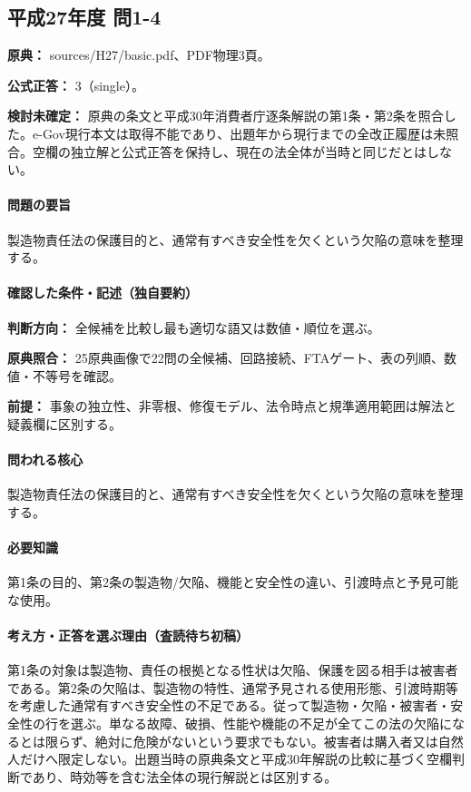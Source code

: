 \subsection{平成27年度 問1-4}
\label{q:h27-reg-basic-1-4}

\noindent\textbf{原典：} sources/H27/basic.pdf、PDF物理3頁。

\textbf{公式正答：} 3（single）。

\par\textbf{検討未確定：} 原典の条文と平成30年消費者庁逐条解説の第1条・第2条を照合した。e-Gov現行本文は取得不能であり、出題年から現行までの全改正履歴は未照合。空欄の独立解と公式正答を保持し、現在の法全体が当時と同じだとはしない。

\paragraph{問題の要旨} 製造物責任法の保護目的と、通常有すべき安全性を欠くという欠陥の意味を整理する。

\paragraph{確認した条件・記述（独自要約）}\mbox{}\par

\noindent\textbf{判断方向：} 全候補を比較し最も適切な語又は数値・順位を選ぶ。\par

\noindent\textbf{原典照合：} 25原典画像で22問の全候補、回路接続、FTAゲート、表の列順、数値・不等号を確認。\par

\noindent\textbf{前提：} 事象の独立性、非零根、修復モデル、法令時点と規準適用範囲は解法と疑義欄に区別する。\par

\paragraph{問われる核心} 製造物責任法の保護目的と、通常有すべき安全性を欠くという欠陥の意味を整理する。

\paragraph{必要知識} 第1条の目的、第2条の製造物/欠陥、機能と安全性の違い、引渡時点と予見可能な使用。

\paragraph{考え方・正答を選ぶ理由（査読待ち初稿）} 第1条の対象は製造物、責任の根拠となる性状は欠陥、保護を図る相手は被害者である。第2条の欠陥は、製造物の特性、通常予見される使用形態、引渡時期等を考慮した通常有すべき安全性の不足である。従って製造物・欠陥・被害者・安全性の行を選ぶ。単なる故障、破損、性能や機能の不足が全てこの法の欠陥になるとは限らず、絶対に危険がないという要求でもない。被害者は購入者又は自然人だけへ限定しない。出題当時の原典条文と平成30年解説の比較に基づく空欄判断であり、時効等を含む法全体の現行解説とは区別する。

